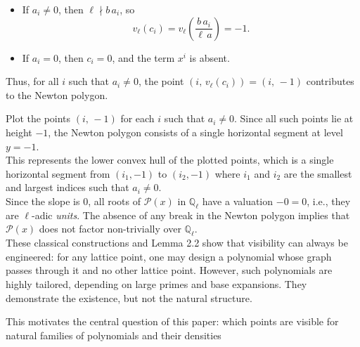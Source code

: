 \documentclass[12pt, reqno]{amsart}
\theoremstyle{definition}
\theoremstyle{remark}
\numberwithin{equation}{section}
\begin{document}
\begin{itemize}
    \item If $a_i \ne 0$, then $\ell \nmid b\,a_i$, so
    \[
    v_\ell(c_i) = v_\ell\left(\frac{b\,a_i}{\ell\,a}\right) = -1.
    \]
    \item If $a_i = 0$, then $c_i = 0$, and the term $x^i$ is absent.
\end{itemize}

Thus, for all $i$ such that $a_i \ne 0$, the point $(i,\,v_\ell(c_i)) = (i,\,-1)$ contributes to the Newton polygon.

Plot the points $(i,\,-1)$ for each $i$ such that $a_i \ne 0$. Since all such points lie at height $-1$, the Newton polygon consists of a single horizontal segment at level $y = -1$.\\

This represents the lower convex hull of the plotted points, which is a single horizontal segment from $(i_1, -1)$ to $(i_2, -1)$ where $i_1$ and $i_2$ are the smallest and largest indices such that $a_i \ne 0$.\\

 Since the slope is $0$, all roots of $\mathcal{P}(x)$ in $\mathbb{Q}_\ell$ have a valuation $-0 = 0$, i.e., they are $\ell$-adic \textit{units}.
 The absence of any break in the Newton polygon implies that $\mathcal{P}(x)$ does not factor non-trivially over $\mathbb{Q}_\ell$.\\ 



These classical constructions and Lemma 2.2 show that visibility can always be engineered: for any lattice point, one may design a polynomial whose graph passes through it and no other lattice point. However, such polynomials are highly tailored, depending on large primes and base expansions. They demonstrate the existence, but not the natural structure.

This motivates the central question of this paper: which points are visible for natural families of polynomials and their densities



\end{document}
